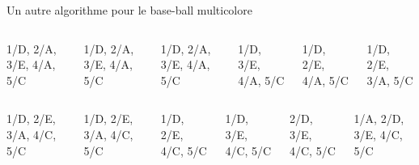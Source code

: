 \documentclass[final,hyperref={pdfpagelabels=false}]{beamer}
\begin{document}
\begin{frame}{Un autre algorithme pour le base-ball multicolore}
\begin{columns}
    \begin{column}{.15\linewidth}\center
                    {1/D, 2/A, 3/E, 4/A, 5/C}
    \end{column}
    \begin{column}{.15\linewidth}\center
                    {1/D, 2/A, 3/E, 4/A, 5/C}
    \end{column}
    \begin{column}{.15\linewidth}\center
                    {1/D, 2/A, 3/E, 4/A, 5/C}
    \end{column}
    \begin{column}{.15\linewidth}\center
                    {1/D,      3/E, 4/A, 5/C}
    \end{column}
    \begin{column}{.15\linewidth}\center
                    {1/D, 2/E,      4/A, 5/C}
    \end{column}    
    \begin{column}{.15\linewidth}\center
                    {1/D, 2/E, 3/A,      5/C}
    \end{column}    
  \end{columns}\vspace{-\baselineskip}
  \begin{columns}
    \begin{column}{.15\linewidth}\center
                    {1/D, 2/E, 3/A, 4/C, 5/C}
    \end{column}    
    \begin{column}{.15\linewidth}\center
                    {1/D, 2/E, 3/A, 4/C, 5/C}
    \end{column}    
    \begin{column}{.15\linewidth}\center
                    {1/D, 2/E,      4/C, 5/C}
    \end{column}    
    \begin{column}{.15\linewidth}\center
                    {1/D,      3/E, 4/C, 5/C}
    \end{column}    
    \begin{column}{.15\linewidth}\center
                    {     2/D, 3/E, 4/C, 5/C}
    \end{column}    
    \begin{column}{.15\linewidth}\center
                    {1/A, 2/D, 3/E, 4/C, 5/C}
    \end{column}    
  \end{columns}


\end{frame}
\end{document}
